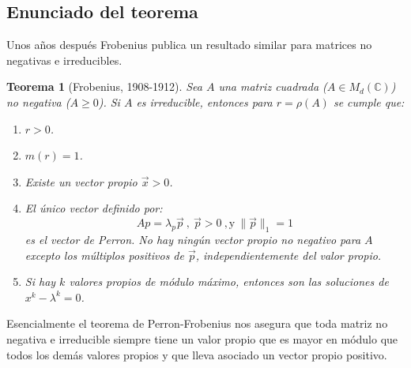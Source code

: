 \documentclass[size=a4, parskip=half, titlepage=false, toc=flat, toc=bib, 12pt]{scrartcl}
\theoremstyle{theorem-style}
\newtheorem{nth}{Teorema}[section]
\theoremstyle{definition-style}
\theoremstyle{remark-style}
\theoremstyle{example-style}
\theoremstyle{definition-style}
\theoremstyle{remark-style}
\begin{document}
\newpage


\subsection{Enunciado del teorema}

Unos años después Frobenius publica un resultado similar para matrices no negativas e irreducibles.

\begin{nth}[Frobenius, 1908-1912]
Sea $A $ una matriz cuadrada ($A \in M_d(\mathbb{C})$) no negativa ($A \geq 0$). Si $A$ es irreducible, entonces para $r = \rho(A)$ se cumple que:
\begin{enumerate}
\item $r >0$.
\item $m(r) = 1$.
\item Existe un vector propio $\vec{x} > 0$.
\item El único vector definido por:
$$Ap = \lambda_p \vec{p}  \ , \ \vec{p}> 0 \ , \textrm{y} \ \|\vec{p}\|_1 = 1 $$
es el vector de Perron. No hay ningún vector propio no negativo para $A$ excepto los múltiplos positivos de $\vec{p}$, independientemente del valor propio.
\item Si hay $k$ valores propios de módulo máximo, entonces son las soluciones de $x^k - \lambda^k = 0$.
\end{enumerate}
\end{nth}

Esencialmente el teorema de Perron-Frobenius nos asegura que toda matriz no negativa e irreducible siempre tiene un valor propio que es mayor en módulo que todos los demás valores propios y que lleva asociado un vector propio positivo.
\end{document}
